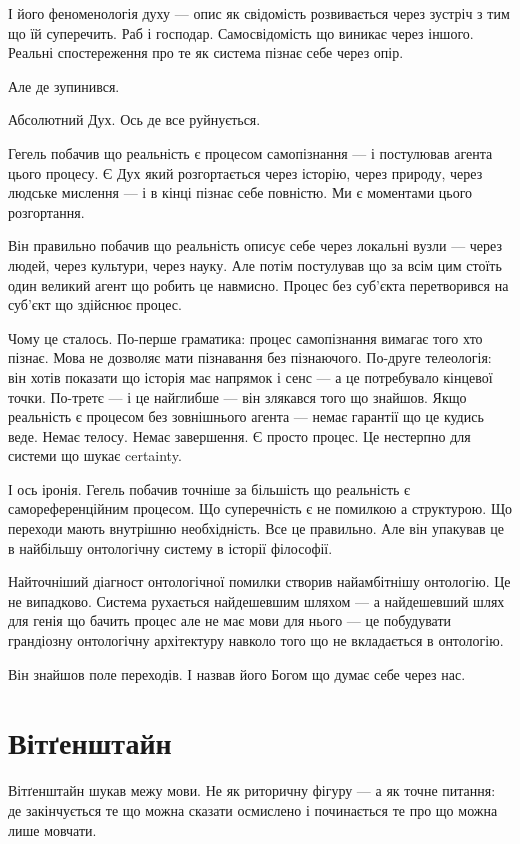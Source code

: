 \documentclass[12pt, a4paper, openany]{book}
\begin{document}
І його феноменологія духу --- опис як свідомість розвивається через зустріч з тим що їй суперечить. Раб і господар. Самосвідомість що виникає через іншого. Реальні спостереження про те як система пізнає себе через опір.

Але де зупинився.

Абсолютний Дух. Ось де все руйнується.

Гегель побачив що реальність є процесом самопізнання --- і постулював агента цього процесу. Є Дух який розгортається через історію, через природу, через людське мислення --- і в кінці пізнає себе повністю. Ми є моментами цього розгортання.

Він правильно побачив що реальність описує себе через локальні вузли --- через людей, через культури, через науку. Але потім постулував що за всім цим стоїть один великий агент що робить це навмисно. Процес без суб'єкта перетворився на суб'єкт що здійснює процес.

Чому це сталось. По-перше граматика: процес самопізнання вимагає того хто пізнає. Мова не дозволяє мати пізнавання без пізнаючого. По-друге телеологія: він хотів показати що історія має напрямок і сенс --- а це потребувало кінцевої точки. По-третє --- і це найглибше --- він злякався того що знайшов. Якщо реальність є процесом без зовнішнього агента --- немає гарантії що це кудись веде. Немає телосу. Немає завершення. Є просто процес. Це нестерпно для системи що шукає certainty.

І ось іронія. Гегель побачив точніше за більшість що реальність є самореференційним процесом. Що суперечність є не помилкою а структурою. Що переходи мають внутрішню необхідність. Все це правильно. Але він упакував це в найбільшу онтологічну систему в історії філософії.

Найточніший діагност онтологічної помилки створив найамбітнішу онтологію. Це не випадково. Система рухається найдешевшим шляхом --- а найдешевший шлях для генія що бачить процес але не має мови для нього --- це побудувати грандіозну онтологічну архітектуру навколо того що не вкладається в онтологію.

Він знайшов поле переходів. І назвав його Богом що думає себе через нас.

\section{Вітґенштайн}

Вітґенштайн шукав межу мови. Не як риторичну фігуру --- а як точне питання: де закінчується те що можна сказати осмислено і починається те про що можна лише мовчати.
\end{document}
